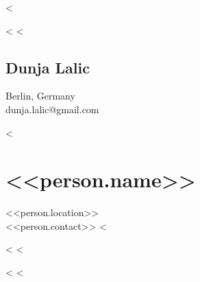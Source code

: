 <%



<%
  <%
    \begin{paracol}{2}
    \begin{leftcolumn}
    \noindent
    \end{leftcolumn}

    \begin{rightcolumn}
    \section{Dunja Lalic}
    Berlin, Germany\\
    dunja.lalic@gmail.com
    \end{rightcolumn}
    \end{paracol}
  <%
    \section{<<person.name>>}
    <<person.location>>\\
    <<person.contact>>
<%


\begin{paracol}{2}
\begin{leftcolumn}
<%
<%
\end{leftcolumn}

\begin{rightcolumn}
<%
<%
\end{rightcolumn}
\end{paracol}

